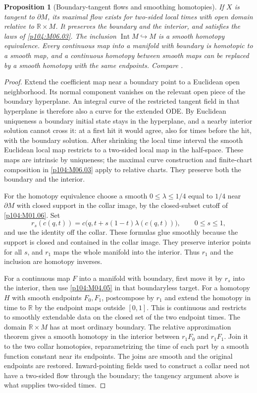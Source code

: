 \documentclass[11pt,oneside,openany]{book}
\newtheorem{proposition}[theorem]{Proposition}
\theoremstyle{definition}
\theoremstyle{remark}
\newcommand{\R}{\mathbb R}
\begin{document}
\begin{proposition}[Boundary-tangent flows and smoothing homotopies]\label{p104:M06.06}
If \(X\) is tangent to \(\partial M\), its maximal flow exists for two-sided local times with open domain relative to \(\R\times M\). It preserves the boundary and the interior, and satisfies the laws of \cref{p104:M06.03}. The inclusion \(\operatorname{Int}M\hookrightarrow M\) is a smooth homotopy equivalence. Every continuous map into a manifold with boundary is homotopic to a smooth map, and a continuous homotopy between smooth maps can be replaced by a smooth homotopy with the same endpoints. Compare \cite[Theorems 9.26--9.29 and 9.34--9.35]{lee}.
\end{proposition}
\begin{proof}
Extend the coefficient map near a boundary point to a Euclidean open neighborhood. Its normal component vanishes on the relevant open piece of the boundary hyperplane. An integral curve of the restricted tangent field in that hyperplane is therefore also a curve for the extended ODE. By Euclidean uniqueness a boundary initial state stays in the hyperplane, and a nearby interior solution cannot cross it: at a first hit it would agree, also for times before the hit, with the boundary solution. After shrinking the local time interval the smooth Euclidean local map restricts to a two-sided local map in the half-space. These maps are intrinsic by uniqueness; the maximal curve construction and finite-chart composition in \cref{p104:M06.03} apply to relative charts. They preserve both the boundary and the interior.

For the homotopy equivalence choose a smooth \(0\leq\lambda\leq 1/4\) equal to \(1/4\) near \(\partial M\) with closed support in the collar image, by the closed-subset cutoff of \cref{p104:M01.06}. Set
\[
 r_s(c(q,t))=c\bigl(q,t+s(1-t)\lambda(c(q,t))\bigr),\qquad 0\leq s\leq1,
\]
and use the identity off the collar. These formulas glue smoothly because the support is closed and contained in the collar image. They preserve interior points for all \(s\), and \(r_1\) maps the whole manifold into the interior. Thus \(r_1\) and the inclusion are homotopy inverses.

For a continuous map \(F\) into a manifold with boundary, first move it by \(r_s\) into the interior, then use \cref{p104:M04.05} in that boundaryless target. For a homotopy \(H\) with smooth endpoints \(F_0,F_1\), postcompose by \(r_1\) and extend the homotopy in time to \(\R\) by the endpoint maps outside \([0,1]\). This is continuous and restricts to smoothly extendable data on the closed set of the two endpoint times. The domain \(\R\times M\) has at most ordinary boundary. The relative approximation theorem gives a smooth homotopy in the interior between \(r_1F_0\) and \(r_1F_1\). Join it to the two collar homotopies, reparametrizing the time of each part by a smooth function constant near its endpoints. The joins are smooth and the original endpoints are restored. Inward-pointing fields used to construct a collar need not have a two-sided flow through the boundary; the tangency argument above is what supplies two-sided times.
\end{proof}
\end{document}

